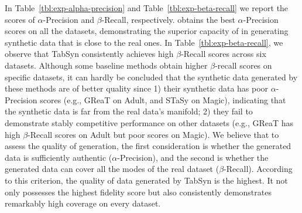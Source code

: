 In Table~\ref{tbl:exp-alpha-precision} and Table~\ref{tbl:exp-beta-recall} we report the scores of $\alpha$-Precision and $\beta$-Recall, respectively. \modelname obtains the best $\alpha$-Precision scores on all the datasets, demonstrating the superior capacity of \modelname in generating synthetic data that is close to the real ones. In Table~\ref{tbl:exp-beta-recall}, we observe that TabSyn consistently achieves high $\beta$-Recall scores across six datasets. Although some baseline methods obtain higher $\beta$-recall scores on specific datasets, it can hardly be concluded that the synthetic data generated by these methods are of better quality since 1) their synthetic data has poor $\alpha$-Precision scores (e.g., GReaT on Adult, and STaSy on Magic), indicating that the synthetic data is far from the real data's manifold; 2) they fail to demonstrate stably competitive performance on other datasets (e.g., GReaT has high $\beta$-Recall scores on Adult but poor scores on Magic). We believe that to assess the quality of generation, the first consideration is whether the generated data is sufficiently authentic ($\alpha$-Precision), and the second is whether the generated data can cover all the modes of the real dataset ($\beta$-Recall). According to this criterion, the quality of data generated by TabSyn is the highest. It not only possesses the highest fidelity score but also consistently demonstrates remarkably high coverage on every dataset.

